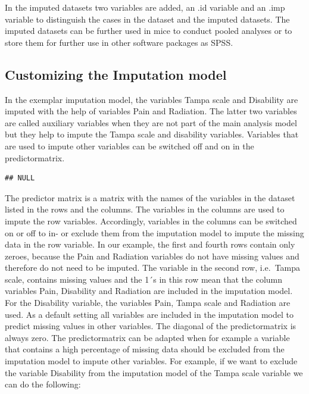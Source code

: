 \documentclass[]{book}
\newenvironment{Shaded}{\begin{snugshade}}{\end{snugshade}}
\newcommand{\OperatorTok}[1]{\textcolor[rgb]{0.81,0.36,0.00}{\textbf{#1}}}
\newcommand{\NormalTok}[1]{#1}
\begin{document}
In the imputed datasets two variables are added, an .id variable and an
.imp variable to distinguish the cases in the dataset and the imputed
datasets. The imputed datasets can be further used in mice to conduct
pooled analyses or to store them for further use in other software
packages as SPSS.

\subsection{Customizing the Imputation
model}\label{customizing-the-imputation-model}

In the exemplar imputation model, the variables Tampa scale and
Disability are imputed with the help of variables Pain and Radiation.
The latter two variables are called auxiliary variables when they are
not part of the main analysis model but they help to impute the Tampa
scale and disability variables. Variables that are used to impute other
variables can be switched off and on in the predictormatrix.

\begin{Shaded}
\end{Shaded}

\begin{verbatim}
## NULL
\end{verbatim}

The predictor matrix is a matrix with the names of the variables in the
dataset listed in the rows and the columns. The variables in the columns
are used to impute the row variables. Accordingly, variables in the
columns can be switched on or off to in- or exclude them from the
imputation model to impute the missing data in the row variable. In our
example, the first and fourth rows contain only zeroes, because the Pain
and Radiation variables do not have missing values and therefore do not
need to be imputed. The variable in the second row, i.e.~Tampa scale,
contains missing values and the 1´s in this row mean that the column
variables Pain, Disability and Radiation are included in the imputation
model. For the Disability variable, the variables Pain, Tampa scale and
Radiation are used. As a default setting all variables are included in
the imputation model to predict missing values in other variables. The
diagonal of the predictormatrix is always zero. The predictormatrix can
be adapted when for example a variable that contains a high percentage
of missing data should be excluded from the imputation model to impute
other variables. For example, if we want to exclude the variable
Disability from the imputation model of the Tampa scale variable we can
do the following:
\end{document}

